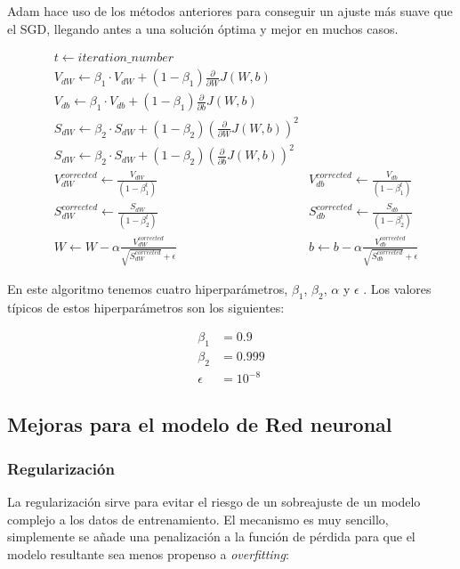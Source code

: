 Adam hace uso de los métodos anteriores para conseguir un ajuste más suave que el SGD, llegando antes a una solución óptima y mejor en muchos casos.

\begin{align}
	&t \leftarrow iteration\_number\\
	&V_{dW} \leftarrow \beta_1 \cdot V_{dW} + (1 - \beta_1) \frac{\partial}{\partial W} J(W,b)\\
	&V_{db} \leftarrow \beta_1 \cdot V_{db} + (1 - \beta_1) \frac{\partial}{\partial b} J(W,b)\\
	&S_{dW} \leftarrow \beta_2 \cdot S_{dW} + (1 - \beta_2) \left( \frac{\partial}{\partial W} J(W,b) \right)^2\\
	&S_{dW} \leftarrow \beta_2 \cdot S_{dW} + (1 - \beta_2) \left( \frac{\partial}{\partial b} J(W,b) \right)^2\\
	&V_{dW}^{corrected} \leftarrow \frac{V_{dW}}{(1 - \beta_1^t)}
	&V_{db}^{corrected} \leftarrow \frac{V_{db}}{(1 - \beta_1^t)}\\
	&S_{dW}^{corrected} \leftarrow \frac{S_{dW}}{(1 - \beta_2^t)}
	&S_{db}^{corrected} \leftarrow \frac{S_{db}}{(1 - \beta_2^t)}\\
	&W \leftarrow W - \alpha \frac{V_{dW}^{corrected}}{\sqrt{S_{dW}^{corrected}} + \epsilon}
	& b \leftarrow b - \alpha \frac{V_{db}^{corrected}}{\sqrt{S_{db}^{corrected}} + \epsilon}
\end{align}

En este algoritmo tenemos cuatro hiperparámetros, $\beta_1$, $\beta_2$, $\alpha$ y $\epsilon$ \cite{kingma2017adam}. Los valores típicos de estos hiperparámetros son los siguientes:

\begin{align*}
	\beta_1 &= 0.9\\
	\beta_2 &= 0.999\\
	\epsilon &= 10^{-8}
\end{align*}

\subsection{Mejoras para el modelo de Red neuronal}

\subsubsection{Regularización}

La regularización sirve para evitar el riesgo de un sobreajuste de un modelo complejo a los datos de entrenamiento. El mecanismo es muy sencillo, simplemente se añade una penalización a la función de pérdida para que el modelo resultante sea menos propenso a \textit{overfitting}:

